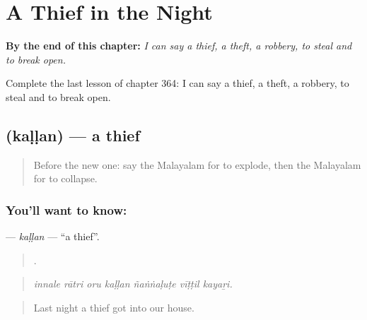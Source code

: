 
\chapter{A Thief in the Night}
\label{ch:ml-a-thief-in-the-night}

\begin{chapteropening}
\textbf{By the end of this chapter:} \emph{I can say a thief, a theft, a robbery, to steal and to break open.}

Complete the last lesson of chapter 364: I can say a thief, a theft, a robbery, to steal and to break open.
\end{chapteropening}

\section[\texorpdfstring{\ml{കള്ളൻ} (kaḷḷan)}{കള്ളൻ (kaḷḷan)}]{ (kaḷḷan) — a thief}

\label{lesson:ML-C364-kallan}



\begin{quote}
Before the new one: say the Malayalam for to explode, then the Malayalam for to collapse.
\end{quote}

\subsection*{You'll want to know: }
\textbf{} — \emph{kaḷḷan} — \textquotedblleft{}a thief\textquotedblright{}.

\begin{quote}
      .
\end{quote}

\begin{quote}
\emph{innale rātri oru kaḷḷan ñaṅṅaḷuṭe vīṭṭil kayaṟi.}
\end{quote}

\begin{quote}
Last night a thief got into our house.
\end{quote}

